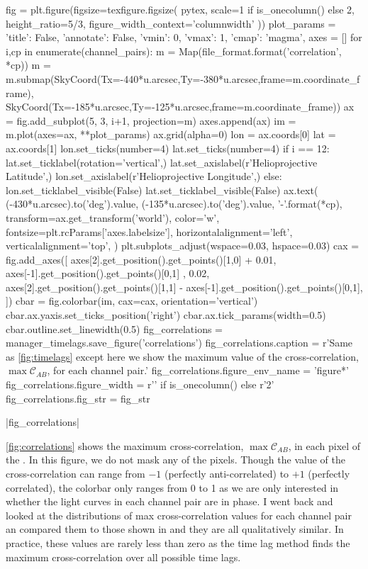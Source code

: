 \begin{pycode}
fig = plt.figure(figsize=texfigure.figsize(
    pytex,
    scale=1 if is_onecolumn() else 2,
    height_ratio=5/3,
    figure_width_context='columnwidth'
))
plot_params = {
    'title': False, 
    'annotate': False,
    'vmin': 0,
    'vmax': 1,
    'cmap': 'magma',
}
axes = []
for i,cp in enumerate(channel_pairs):
    m = Map(file_format.format('correlation', *cp))
    m = m.submap(SkyCoord(Tx=-440*u.arcsec,Ty=-380*u.arcsec,frame=m.coordinate_frame),
                 SkyCoord(Tx=-185*u.arcsec,Ty=-125*u.arcsec,frame=m.coordinate_frame))
    ax = fig.add_subplot(5, 3, i+1, projection=m)
    axes.append(ax)
    im = m.plot(axes=ax, **plot_params)
    ax.grid(alpha=0)
    lon = ax.coords[0]
    lat = ax.coords[1]
    lon.set_ticks(number=4)
    lat.set_ticks(number=4) 
    if i == 12:
        lat.set_ticklabel(rotation='vertical',)
        lat.set_axislabel(r'Helioprojective Latitude',)
        lon.set_axislabel(r'Helioprojective Longitude',)
    else:
        lon.set_ticklabel_visible(False)
        lat.set_ticklabel_visible(False)
    ax.text(
        (-430*u.arcsec).to('deg').value,
        (-135*u.arcsec).to('deg').value,
        '{}-{}'.format(*cp),
        transform=ax.get_transform('world'),
        color='w',
        fontsize=plt.rcParams['axes.labelsize'],
        horizontalalignment='left',
        verticalalignment='top',
    )
plt.subplots_adjust(wspace=0.03, hspace=0.03)
cax = fig.add_axes([
    axes[2].get_position().get_points()[1,0] + 0.01,
    axes[-1].get_position().get_points()[0,1] ,
    0.02,
    axes[2].get_position().get_points()[1,1] - axes[-1].get_position().get_points()[0,1], 
])
cbar = fig.colorbar(im, cax=cax, orientation='vertical')
cbar.ax.yaxis.set_ticks_position('right')
cbar.ax.tick_params(width=0.5)
cbar.outline.set_linewidth(0.5)
fig_correlations = manager_timelags.save_figure('correlations')
fig_correlations.caption = r'Same as \autoref{fig:timelags} except here we show the maximum value of the cross-correlation, $\max\mathcal{C}_{AB}$, for each channel pair.'
fig_correlations.figure_env_name = 'figure*'
fig_correlations.figure_width = r'\columnwidth' if is_onecolumn() else r'2\columnwidth'
fig_correlations.fig_str = fig_str
\end{pycode}
|fig_correlations|

\autoref{fig:correlations} shows the maximum cross-correlation, $\max\mathcal{C}_{AB}$, in each pixel of the \AR{}.
In this figure, we do not mask any of the pixels. Though the value of the cross-correlation can range from $-1$ (perfectly anti-correlated) to $+1$ (perfectly correlated), the colorbar only ranges from 0 to 1 as we are only interested in whether the light curves in each channel pair are in phase.
I went back and looked at the distributions of max cross-correlation values for each channel pair an compared them to those shown in \citet{viall_evidence_2012} and they are all qualitatively similar.
In practice, these values are rarely less than zero as the time lag method finds the maximum cross-correlation over all possible time lags.

